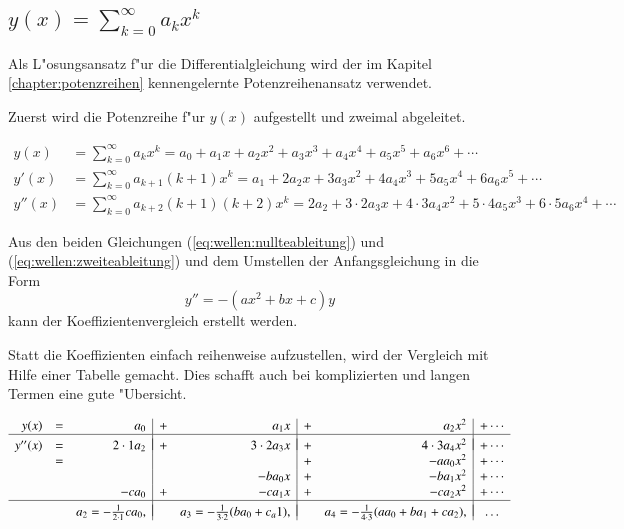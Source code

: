 \subsection{\texorpdfstring{$y(x) = \sum_{k = 0}^{\infty} a_{k}x^k$}{y(x) = 
summe k = 0 bis unendlich ak xk}}

Als L"osungsansatz f"ur die Differentialgleichung wird der im Kapitel 
\ref{chapter:potenzreihen} kennengelernte Potenzreihenansatz verwendet.

Zuerst wird die Potenzreihe f"ur $y(x)$ aufgestellt und zweimal abgeleitet.

\begin{align}
	y(x)
	&=
	\sum_{k = 0}^{\infty} a_{k}x^k
	=
	a_0 + a_1x + a_2x^2 + a_3x^3 + a_4x^4 + a_5x^5 + a_6x^6 + \dotsb
	\label{eq:wellen:nullteableitung}
	\\
	y'(x)
	&=
	\sum_{k=0}^{\infty} a_{k+1}(k+1)x^k
	=
	a_1 + 2a_2x + 3a_3x^2 + 4a_4x^3 + 5a_5x^4 + 6a_6x^5+ \dotsb
	\label{eq:wellen:ersteableitung}
	\\
	y''(x)
	&=
	\sum_{k = 0}^{\infty} a_{k+2}(k+1)(k+2)x^k
	=
	2a_2 + 3 \mathbin{\cdot} 2a_3x + 4 \mathbin{\cdot} 3a_4x^2 + 5 
	\mathbin{\cdot} 4a_5x^3 + 6 \mathbin{\cdot} 5a_6x^4 + \dotsb
	\label{eq:wellen:zweiteableitung}
\end{align}
 
Aus den beiden Gleichungen (\ref{eq:wellen:nullteableitung}) und
(\ref{eq:wellen:zweiteableitung}) und dem Umstellen der Anfangsgleichung in die 
Form
\begin{equation*}
	y'' = -(ax^2+bx+c)y
\end{equation*}
kann der Koeffizientenvergleich erstellt werden. 

Statt die Koeffizienten einfach reihenweise aufzustellen, wird der Vergleich 
mit Hilfe einer Tabelle gemacht. Dies schafft auch bei komplizierten und langen 
Termen eine gute "Ubersicht.

\begin{equation}
	\begin{array}{r c r | c r | c r | c r c}
	y(x) & = &
	a_0 & + & a_1x & + & a_2x^2 & + \dotsb
	\\
	\hline&&&&&&&\\[-2ex]
	y''(x) & = &
	2\cdot1 a_2 & + & 3\cdot2 a_3x & + & 4\cdot3 a_4x^2 & + \dotsb
	\\
	& = &
	& & & + &- aa_0x^2 & + \dotsb
	\\
	& &
	& &- ba_0x & + &- ba_1x^2 & + \dotsb
	\\
	& &
	-ca_0 & + &- ca_1x & + &- ca_2x^2 & + \dotsb
	\\
	\hline&&&&&&&\\[-2ex]
	& &
	a_2 = -\frac{1}{2 \cdot 1}ca_0,
	& & a_3 = -\frac{1}{3 \cdot 2}(ba_0+c_a1),
	& & a_4 = -\frac{1}{4 \cdot 3}(aa_0+ba_1+ca_2),
	& \dots
	\end{array}
	\label{eq:wellen:koeffizietenvergleichtabelle}
\end{equation}

